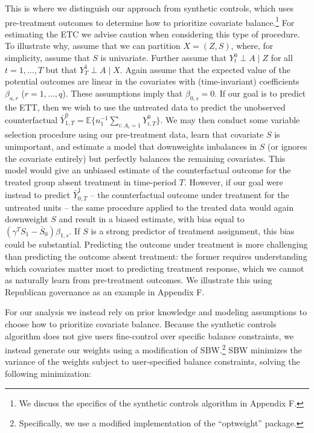 \documentclass[aoas]{imsart}
\theoremstyle{plain}
\theoremstyle{remark}
\begin{document}
This is where we distinguish our approach from synthetic controls, which uses pre-treatment outcomes to determine how to prioritize covariate balance.\footnote{We discuss the specifics of the synthetic controls algorithm in Appendix F.} For estimating the ETC we advise caution when considering this type of procedure. To illustrate why, assume that we can partition $X = (Z, S)$, where, for simplicity, assume that $S$ is univariate. Further assume that $Y^0_t \perp A \mid Z$ for all $t = 1, ..., T$ but that $Y^1_T \perp A \mid X$. Again assume that the expected value of the potential outcomes are linear in the covariates with (time-invariant) coefficients $\beta_{a, r}$ ($r = 1, ..., q$). These assumptions imply that $\beta_{0, s} = 0$. If our goal is to predict the ETT, then we wish to use the untreated data to predict the unobserved counterfactual $\bar{Y}_{1, T}^0 = \mathbb{E}\{n_1^{-1}\sum_{i: A_i = 1}Y_{i, T}^0\}$. We may then conduct some variable selection procedure using our pre-treatment data, learn that covariate $S$ is unimportant, and estimate a model that downweights imbalances in $S$ (or ignores the covariate entirely) but perfectly balances the remaining covariates. This model would give an unbiased estimate of the counterfactual outcome for the treated group absent treatment in time-period $T$. However, if our goal were instead to predict $\bar{Y}^1_{0, T}$ -- the counterfactual outcome under treatment for the untreated units -- the same procedure applied to the treated data would again downweight $S$ and result in a biased estimate, with bias equal to $(\gamma^TS_1 - \bar{S}_0) \beta_{1, s}$. If $S$ is a strong predictor of treatment assignment, this bias could be substantial. Predicting the outcome under treatment is  more challenging than predicting the outcome absent treatment: the former requires understanding which covariates matter most to predicting treatment response, which we cannot as naturally learn from pre-treatment outcomes. We illustrate this using Republican governance as an example in Appendix F.

For our analysis we instead rely on prior knowledge and modeling assumptions to choose how to prioritize covariate balance. Because the synthetic controls algorithm does not give users fine-control over specific balance constraints, we instead generate our weights using a modification of SBW.\footnote{Specifically, we use a modified implementation of the ``optweight'' package.} SBW minimizes the variance of the weights subject to user-specified balance constraints, solving the following minimization:
\end{document}
